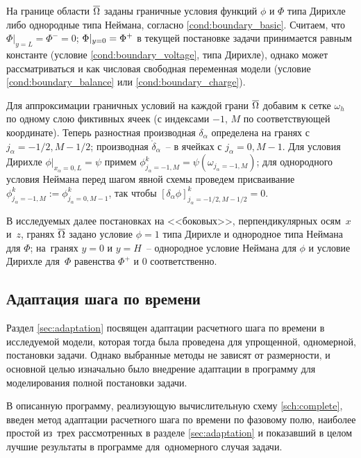 На границе области ${\overline{\Omega}}$ заданы граничные условия функций $\phi$ и $\Phi$ типа Дирихле либо однородные типа Неймана, согласно \eqref{cond:boundary_basic}. Считаем, что $\Phi|_{y = L} = \Phi^- = 0$; $\Phi|_{y = 0} \hm = \Phi^+$ в текущей постановке задачи принимается равным константе (условие \eqref{cond:boundary_voltage}, типа Дирихле), однако может рассматриваться и как числовая свободная переменная модели (условие \eqref{cond:boundary_balance} или \eqref{cond:boundary_charge}).

Для аппроксимации граничных условий на каждой грани ${\overline{\Omega}}$ добавим к сетке $\omega_h$ по одному слою фиктивных ячеек (с индексами $-1$, $M$ по соответствующей координате). Теперь разностная производная $\delta_\alpha$ определена на гранях с $j_\alpha = -1/2, M - 1/2$; производная $\mathring{\delta}_\alpha$~-- в ячейках с $j_\alpha = 0, M - 1$. Для условия Дирихле $\phi|_{x_\alpha = 0, L} = \psi$ примем $\phi^k_{j_\alpha = -1,M} = \psi(\omega_{j_\alpha = -1,M})$; для однородного условия Неймана перед шагом явной схемы проведем присваивание $\phi^k_{j_\alpha = -1,M} := \phi^k_{j_\alpha = 0, M - 1}$, так чтобы $[\delta_\alpha \phi]_{j_\alpha = -1/2, M - 1/2}^k = 0$.

В исследуемых далее постановках на <<боковых>>, перпендикулярных осям~$x$ и~$z$, гранях ${\overline{\Omega}}$ задано условие $\phi = 1$ типа Дирихле и однородное типа Неймана для $\Phi$; на~гранях $y = 0$ и $y = H$~-- однородное условие Неймана для $\phi$ и условие Дирихле для~$\Phi$ равенства $\Phi^+$ и $0$ соответственно.


\subsection{Адаптация шага по времени}

Раздел \ref{sec:adaptation} посвящен адаптации расчетного шага по времени в исследуемой модели, которая тогда была проведена для упрощенной, одномерной, постановки задачи. Однако выбранные методы не зависят от размерности, и основной целью изначально было внедрение адаптации в программу для моделирования полной постановки задачи.

В описанную программу, реализующую вычислительную схему \eqref{sch:complete}, введен метод адаптации расчетного шага по времени по фазовому полю, наиболее простой из~трех рассмотренных в разделе \ref{sec:adaptation} и показавший в целом лучшие результаты в программе для~одномерного случая задачи.


